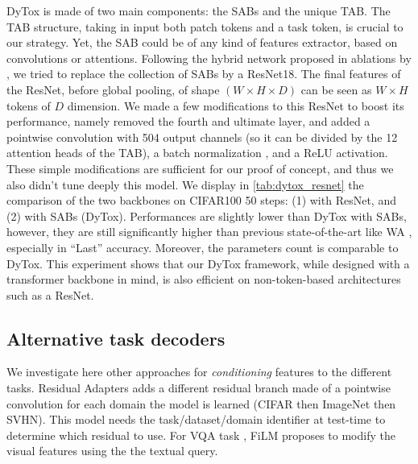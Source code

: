 DyTox is made of two main components: the SABs and the unique TAB. The TAB structure, taking in
input both patch tokens and a task token, is crucial to our strategy. Yet, the SAB could be of any
kind of features extractor, based on convolutions or attentions. Following the hybrid network
proposed in ablations by \citet{dosovitskiy2020vit}, we tried to replace the collection of SABs by a
ResNet18. The final features of the ResNet, before global pooling, of shape $(W \times H \times D)$
can be seen as $W \times H$ tokens of $D$ dimension. We made a few modifications to this ResNet to
boost its performance, namely removed the fourth and ultimate layer, and added a pointwise
convolution with 504 output channels (so it can be divided by the 12 attention heads of the TAB), a
batch normalization \citep{ioffe2015batchnorm}, and a ReLU activation. These simple modifications
are sufficient for our proof of concept, and thus we also didn't tune deeply this model. We display
in \autoref{tab:dytox_resnet} the comparison of the two backbones on CIFAR100 50 steps: (1) with
ResNet, and (2) with SABs (DyTox). Performances are slightly lower than DyTox with SABs, however,
they are still significantly higher than previous state-of-the-art like WA
\citep{zhao2020weightalignement}, especially in ``Last'' accuracy. Moreover, the parameters count is
comparable to DyTox. This experiment shows that our DyTox framework, while designed with a
transformer backbone in mind, is also efficient on non-token-based architectures such as a ResNet.






\subsection{Alternative task decoders}

We investigate here other approaches for \textit{conditioning} features to the different tasks.
Residual Adapters \citep{rebuffi2017residualadapters} adds a different residual branch made of a
pointwise convolution for each domain the model is learned (\eg CIFAR then ImageNet then SVHN). This
model needs the task/dataset/domain identifier at test-time to determine which residual to use. For
VQA task \citep{antol2015vqa}, FiLM \citep{perez2018film} proposes to modify the visual features
using the the textual query.

